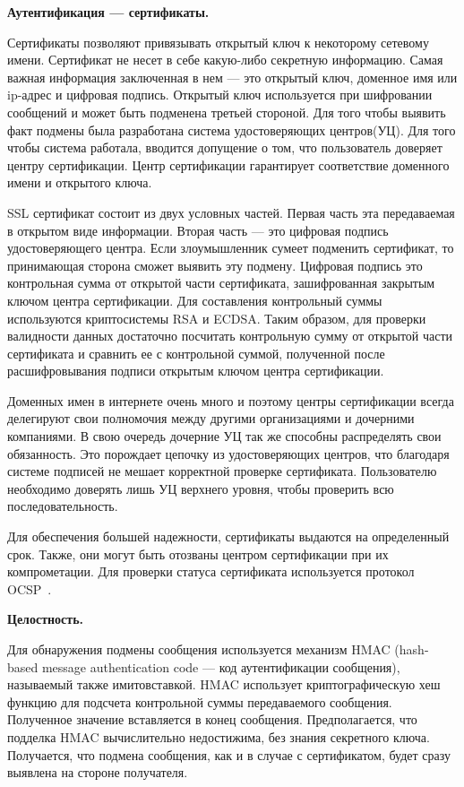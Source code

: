 \textbf{Аутентификация --- сертификаты.}

Сертификаты позволяют привязывать открытый ключ к некоторому сетевому имени. Сертификат не несет в себе какую-либо секретную информацию. Самая важная информация заключенная в нем --- это открытый ключ, доменное имя или ip-адрес и цифровая подпись. Открытый ключ используется при шифровании сообщений и может быть подменена третьей стороной. Для того чтобы выявить факт подмены была разработана система удостоверяющих центров(УЦ). Для того чтобы система работала, вводится допущение о том, что пользователь доверяет центру сертификации. Центр сертификации гарантирует соответствие доменного имени и открытого ключа.

SSL сертификат состоит из двух условных частей. Первая часть эта передаваемая в открытом виде информации. Вторая часть --- это цифровая подпись удостоверяющего центра. Если злоумышленник сумеет подменить сертификат, то принимающая сторона сможет выявить эту подмену. Цифровая подпись это контрольная сумма от открытой части сертификата, зашифрованная закрытым ключом центра сертификации. Для составления контрольный суммы используются криптосистемы RSA и ECDSA. Таким образом, для проверки валидности данных достаточно посчитать контрольную сумму от открытой части сертификата и сравнить ее с контрольной суммой, полученной после расшифровывания подписи открытым ключом центра сертификации.

Доменных имен в интернете очень много и поэтому центры сертификации всегда делегируют свои полномочия между другими организациями и дочерними компаниями. В свою очередь дочерние УЦ так же способны распределять свои обязанность. Это порождает цепочку из удостоверяющих центров, что благодаря системе подписей не мешает корректной проверке сертификата. Пользователю необходимо доверять лишь УЦ верхнего уровня, чтобы проверить всю последовательность.

Для обеспечения большей надежности, сертификаты выдаются на определенный срок. Также, они могут быть отозваны центром сертификации при их компрометации. Для проверки статуса сертификата используется протокол OCSP~\cite{OCSP}.

\textbf{Целостность.}

Для обнаружения подмены сообщения используется механизм HMAC (hash-based message authentication code --- код аутентификации сообщения), называемый также имитовставкой. HMAC использует криптографическую хеш функцию для подсчета контрольной суммы передаваемого сообщения. Полученное значение вставляется в конец сообщения. Предполагается, что подделка HMAC вычислительно недостижима, без знания секретного ключа. Получается, что подмена сообщения, как и в случае с сертификатом, будет сразу выявлена на стороне получателя.



